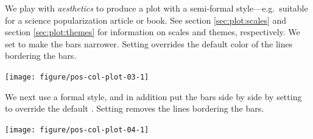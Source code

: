 \documentclass[krantz2]{krantz}\usepackage{knitr}%
\begin{document}
We play with \emph{aesthetics} to produce a plot with a semi-formal style---e.g.\ suitable for a science popularization article or book. See section \ref{sec:plot:scales} and section \ref{sec:plot:themes} for information on scales and themes, respectively. We set  to make the bars narrower. Setting  overrides the default color of the lines bordering the bars.

\begin{knitrout}\footnotesize
{}\color{fgcolor}\begin{kframe}
\begin{alltt}
 \hlstd{(}      \hlopt{+}
     \hlstd{(} \hlstd{=} \hlstd{,}  \hlstd{=} \hlstd{)} \hlopt{+}
     \hlstd{()} \hlopt{+} \hlstd{()}
\end{alltt}
\end{kframe}

{\centering \texttt{[image: figure/pos-col-plot-03-1]} 

}



\end{knitrout}

We next use a formal style, and in addition put the bars side by side by setting  to override the default . Setting  removes the lines bordering the bars.

\begin{knitrout}\footnotesize
{}\color{fgcolor}\begin{kframe}
\begin{alltt}
 \hlstd{(}      \hlopt{+}
     \hlstd{(} \hlstd{=} \hlstd{,}  \hlstd{=} \hlstd{)} \hlopt{+}
     \hlstd{()} \hlopt{+} \hlstd{()}
\end{alltt}
\end{kframe}

{\centering \texttt{[image: figure/pos-col-plot-04-1]} 

}



\end{knitrout}
\end{document}
